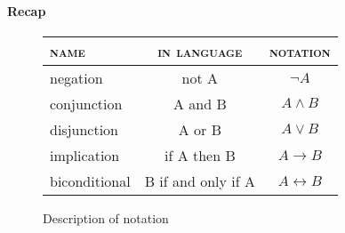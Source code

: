\paragraph{Recap}

\begin{figure}[H]
  \centering
  \begin{tabular}{lcc}
    \textsc{name} & \textsc{in language} & \textsc{notation} \\\hline
    negation & not A & $\lnot A$ \\ \hline
    conjunction & A and B & $A \land B$ \\ \hline
    disjunction & A or B & $A \lor B$ \\ \hline
    implication & if A then B & $A \to B$ \\ \hline
    biconditional & B if and only if A & $A \leftrightarrow B$ \\ \hline

  \end{tabular}
  \caption{Description of notation}
  \label{fig:propositional}
\end{figure}








